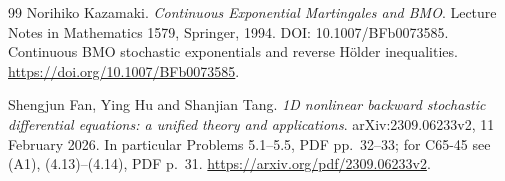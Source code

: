 \documentclass[11pt,a4paper]{article}
\theoremstyle{definition}
\begin{document}
\clearpage
\begin{thebibliography}{99}
Norihiko Kazamaki. \emph{Continuous Exponential Martingales and BMO}. Lecture Notes in Mathematics 1579, Springer, 1994. DOI: 10.1007/BFb0073585. Continuous BMO stochastic exponentials and reverse H\"older inequalities. \url{https://doi.org/10.1007/BFb0073585}.

Shengjun Fan, Ying Hu and Shanjian Tang. \emph{1D nonlinear backward stochastic differential equations: a unified theory and applications}. arXiv:2309.06233v2, 11 February 2026. In particular Problems 5.1--5.5, PDF pp.\ 32--33; for C65-45 see (A1), (4.13)--(4.14), PDF p.\ 31. \url{https://arxiv.org/pdf/2309.06233v2}.

\end{thebibliography}
\end{document}
